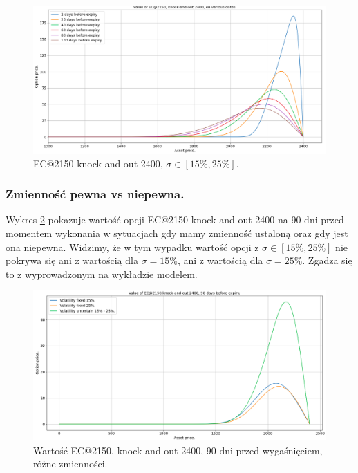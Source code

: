 \documentclass[12pt]{article}
\begin{document}
\begin{figure}[H]
    \centering
    \includegraphics[width=\textwidth,height=\textheight,keepaspectratio]{ec_2150_b_2400_various_dates.png}
    \caption{EC@2150 knock-and-out 2400, $\sigma \in [15\%, 25\%].$}
    \label{fig:ec_2150_b_2400_different_dates}
\end{figure}

\subsubsection{Zmienność pewna vs niepewna.}
Wykres \ref{fig:ec_2150_b_2400_90_days_uncertain_vs_fixed} pokazuje wartość opcji EC@2150 knock-and-out 2400 na 90 dni przed momentem wykonania w sytuacjach gdy mamy zmienność ustaloną oraz gdy jest ona niepewna. Widzimy, że w tym wypadku wartość opcji z $\sigma \in [15\%, 25\%]$ nie pokrywa się ani z wartością dla $\sigma=15\%$, ani z wartością dla $\sigma=25\%$. Zgadza się to z wyprowadzonym na wykładzie modelem. 

\begin{figure}[H]
    \centering
    \includegraphics[width=\textwidth,height=\textheight,keepaspectratio]{ec_2150_b_2400_90_days_uncertain_vs_fixed.png}
    \caption{Wartość EC@2150, knock-and-out 2400, 90 dni przed wygaśnięciem, różne zmienności.}
    \label{fig:ec_2150_b_2400_90_days_uncertain_vs_fixed}
\end{figure}
\end{document}
